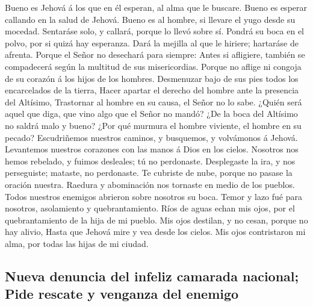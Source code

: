  Bueno es Jehová á los que en él esperan, al alma que le
buscare.  Bueno es esperar callando en la salud de Jehová.
 Bueno es al hombre, si llevare el yugo desde su mocedad.
 Sentaráse solo, y callará, porque lo llevó sobre sí.
 Pondrá su boca en el polvo, por si quizá hay esperanza.
 Dará la mejilla al que le hiriere; hartaráse de afrenta.
 Porque el Señor no desechará para siempre: 
Antes si afligiere, también se compadecerá según la multitud de sus
misericordias.  Porque no aflige ni congoja de su corazón á
los hijos de los hombres.  Desmenuzar bajo de sus pies
todos los encarcelados de la tierra,  Hacer apartar el
derecho del hombre ante la presencia del Altísimo, 
Trastornar al hombre en su causa, el Señor no lo sabe. 
¿Quién será aquel que diga, que vino algo que el Señor no mandó?
 ¿De la boca del Altísimo no saldrá malo y bueno?
 ¿Por qué murmura el hombre viviente, el hombre en su
pecado?  Escudriñemos nuestros caminos, y busquemos, y
volvámonos á Jehová.  Levantemos nuestros corazones con las
manos á Dios en los cielos.  Nosotros nos hemos rebelado, y
fuimos desleales; tú no perdonaste.  Desplegaste la ira, y
nos perseguiste; mataste, no perdonaste.  Te cubriste de
nube, porque no pasase la oración nuestra.  Raedura y
abominación nos tornaste en medio de los pueblos.  Todos
nuestros enemigos abrieron sobre nosotros su boca.  Temor y
lazo fué para nosotros, asolamiento y quebrantamiento. 
Ríos de aguas echan mis ojos, por el quebrantamiento de la hija de mi
pueblo.  Mis ojos destilan, y no cesan, porque no hay
alivio,  Hasta que Jehová mire y vea desde los cielos.
 Mis ojos contristaron mi alma, por todas las hijas de mi
ciudad.

\hypertarget{nueva-denuncia-del-infeliz-camarada-nacional-pide-rescate-y-venganza-del-enemigo}{%
\subsection{Nueva denuncia del infeliz camarada nacional; Pide rescate y
venganza del
enemigo}\label{nueva-denuncia-del-infeliz-camarada-nacional-pide-rescate-y-venganza-del-enemigo}}

